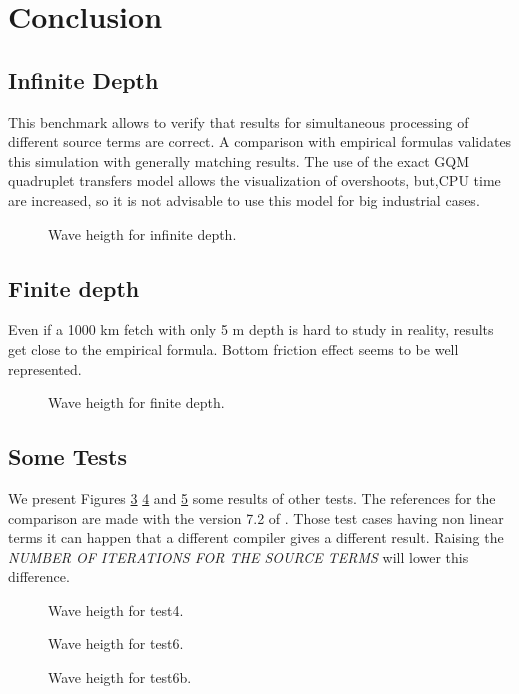 \section{Conclusion}
\subsection{Infinite Depth}
This benchmark allows to verify that \tomawac results for simultaneous
processing of different source terms are correct. A comparison with empirical
formulas validates this simulation with generally matching results. The use of
the exact GQM quadruplet transfers model allows the visualization of
overshoots, but,CPU time are increased, so it is not advisable to use this
model for big industrial cases.
\begin{figure}[h!]
  \centering
  \caption{Wave heigth for infinite depth.}
\label{resultinfinite}
\end{figure}

\subsection{Finite depth}
Even if a 1000 km fetch with only 5 m depth is hard to study in reality,
\tomawac results get close to the empirical formula. Bottom friction effect
seems to be well represented.
\begin{figure}[h!]
  \centering
  \caption{Wave heigth for finite depth.}
\label{finite}
\end{figure}


\subsection{Some Tests}
We present Figures \ref{test4} \ref{test6} and \ref{test6b} some results of
other tests. The references for the comparison are made with the version 7.2 of
\tomawac. Those test cases having non linear terms it can happen that a
different compiler gives a different result. Raising the {\it NUMBER OF
  ITERATIONS FOR THE SOURCE TERMS } will lower this difference. 
\begin{figure}[h!]
  \centering
  \caption{Wave heigth for test4.}
\label{test4}
\end{figure}
\begin{figure}[h!]
  \centering
  \caption{Wave heigth for test6.}
\label{test6}
\end{figure}
\begin{figure}[h!]
  \centering
  \caption{Wave heigth for test6b.}
\label{test6b}
\end{figure}
